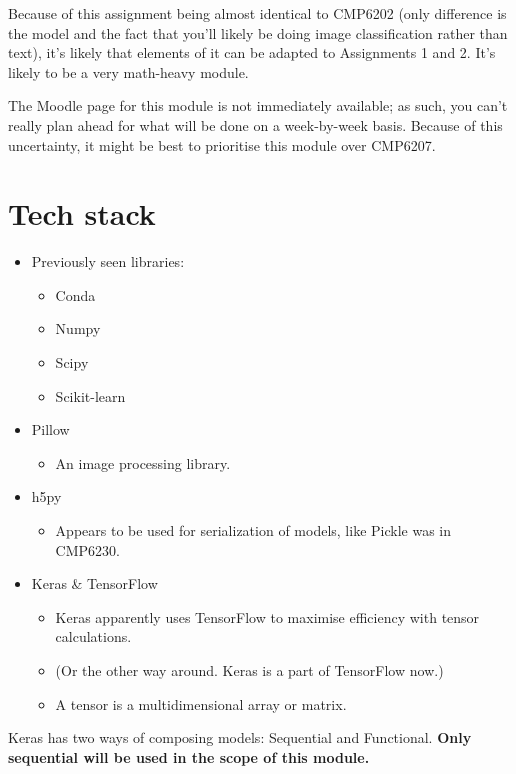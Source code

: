 \documentclass[12pt]{report}
\newcommand{\para}{\vspace{7pt}\noindent}
\begin{document}
\para Because of this assignment being almost identical to CMP6202 (only difference is the model and 
the fact that you'll likely be doing image classification rather than text),
it's likely that elements of it can be adapted to Assignments 1 and 2. It's likely to be a very math-heavy 
module.

\para The Moodle page for this module is not immediately available; as such, you can't really plan ahead 
for what will be done on a week-by-week basis. Because of this uncertainty, it might be best to prioritise 
this module over CMP6207.  

\chapter*{Tech stack}
\begin{itemize}
    \item Previously seen libraries:
    \begin{itemize}
        \item Conda 
        \item Numpy
        \item Scipy 
        \item Scikit-learn 
    \end{itemize}
    \item Pillow
    \begin{itemize}
        \item An image processing library.
    \end{itemize}
    \item h5py
    \begin{itemize}
        \item Appears to be used for serialization of models, like Pickle was in CMP6230.
    \end{itemize}
    \item Keras \& TensorFlow
    \begin{itemize}
        \item Keras apparently uses TensorFlow to maximise efficiency with tensor calculations.
        \item (Or the other way around. Keras is a part of TensorFlow now.)
        \item A tensor is a multidimensional array or matrix.
    \end{itemize}
\end{itemize}

\para Keras has two ways of composing models: Sequential and Functional. \textbf{Only sequential will be 
used in the scope of this module.} 
\vspace{8pt}
\end{document}
